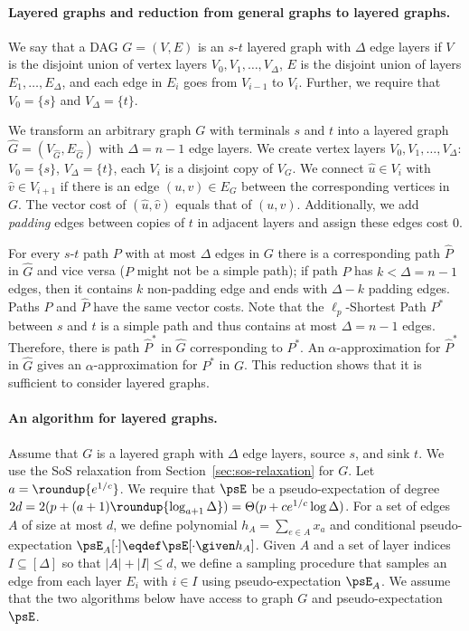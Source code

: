 \documentclass[11pt,a4paper]{article}
\begin{document}
\paragraph{Layered graphs and reduction from general graphs to layered graphs.}
We say that a DAG $G = (V, E)$ is an $s$-$t$ layered graph with $\Delta$ edge layers if 
$V$ is the disjoint union of vertex layers $V_0,V_1,\dots,V_{\Delta}$, $E$ is the disjoint union of layers $E_1,\dots, E_{\Delta}$, and each edge in \(E_i\) goes from \(V_{i-1}\) to \(V_i\).
Further, we require that $V_0=\{s\}$ and $V_\Delta = \{t\}$.

We transform an arbitrary graph $G$ with terminals $s$ and $t$ into a layered graph $\hat G=(V_{\hat{G}}, E_{\hat G})$ with $\Delta = n-1$ edge layers. We create vertex layers $V_0,V_1,\dots,V_{\Delta}$: $V_0= \{s\}$, $V_\Delta = \{t\}$, each $V_i$ is a disjoint copy of $V_G$. We connect $\hat u\in V_i$ with $\hat v\in V_{i+1}$ if there is an edge $(u,v)\in E_G$ between the corresponding vertices in $G$. The vector cost of $(\hat u, \hat v)$ equals that of $(u,v)$.
Additionally, we add \textit{padding} edges between copies of $t$ in adjacent layers and assign these edges cost $0$. 

For every $s$-$t$ path $P$ with at most $\Delta$ edges in $G$ there is a corresponding path $\hat P$ in $\hat G$ and vice versa ($P$ might not be a simple path); if path $P$ has $k < \Delta = n-1$ edges, then it contains $k$ non-padding edge and ends with $\Delta - k$ padding edges. Paths $P$ and $\hat P$ have the same vector costs.
Note that the $\ell_p$-Shortest Path $P^*$ between $s$ and $t$ is a simple path and thus contains at most $\Delta = n-1$ edges. Therefore, there is path $\hat P^*$ in $\hat G$ corresponding to $P^*$. An $\alpha$-approximation for $\hat P^*$ in $\hat G$ gives an $\alpha$-approximation for $P^*$ in $G$. 
This reduction shows that it is sufficient to consider layered graphs.

\paragraph{An algorithm for layered graphs.}
Assume that $G$ is a layered graph with $\Delta$ edge layers, source $s$, and sink $t$.
We use the SoS relaxation from Section~\ref{sec:sos-relaxation} for $G$. Let $a = \roundup{e^{1/c}}$.
We require that $\psE$ be a pseudo-expectation of degree $2d = 2(p+(a+1)\roundup{\log_{a+1} \Delta}) = \Theta(p + ce^{1/c}\log \Delta)$. 
%
For a set of edges $A$ of  size at most $d$, we define polynomial $h_A = \sum_{e\in A} x_a$ and conditional pseudo-expectation $\psE_A[\cdot]\eqdef \psE[\cdot\given h_A]$.
Given $A$ and a set of layer indices $I\subseteq [\Delta]$ so that $|A| + |I| \leq d$, we define a sampling procedure that samples an edge from each layer $E_i$ with $i\in I$ using pseudo-expectation $\psE_A$.
We assume that the two algorithms below have access to graph $G$ and pseudo-expectation $\psE$.
\end{document}
